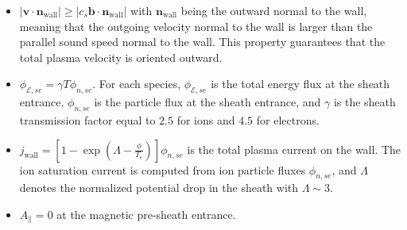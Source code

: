 \begin{itemize}
	\item $|\boldsymbol{v}\cdot \boldsymbol{n}_\text{wall} | \ge | c_s \boldsymbol{b}\cdot \boldsymbol{n}_\text{wall} |$ with $\boldsymbol{n}_\text{wall}$ being the outward normal to the wall, meaning that the outgoing velocity normal to the wall is larger than the parallel sound speed normal to the wall. This property guarantees that the total plasma velocity is oriented outward.
	\item $\phi_{\mathcal{E},se} =  \gamma T \phi_{n,se}$. For each species, $\phi_{\mathcal{E},se}$ is the total energy flux at the sheath entrance, $\phi_{n,se}$ is the particle flux at the sheath entrance, and $\gamma$ is the sheath transmission factor equal to $2.5$ for ions and $4.5$ for electrons.
	\item $j_\text{wall} = \left[1 - \exp\left( \Lambda - \frac{\phi}{T_e} \right) \right] \phi_{n,se}$ is the total plasma current on the wall. The ion saturation current is computed from ion particle fluxes $\phi_{n,se}$, and $\Lambda$ denotes the normalized potential drop in the sheath with $\Lambda \sim 3$.
	\item $A_{\parallel}=0$ at the magnetic pre-sheath entrance.
\end{itemize}






